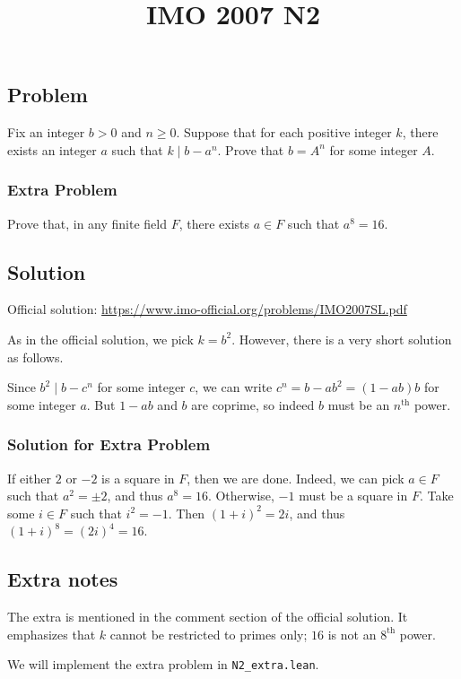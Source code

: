\documentclass{article}
\title{IMO 2007 N2}
\author{}
\date{}
\begin{document}
\maketitle



\subsection*{Problem}

Fix an integer $b > 0$ and $n \geq 0$.
Suppose that for each positive integer $k$, there exists an integer $a$ such that $k \mid b - a^n$.
Prove that $b = A^n$ for some integer $A$.


\subsubsection*{Extra Problem}

Prove that, in any finite field $F$, there exists $a \in F$ such that $a^8 = 16$.



\subsection*{Solution}

Official solution: \url{https://www.imo-official.org/problems/IMO2007SL.pdf}

As in the official solution, we pick $k = b^2$.
However, there is a very short solution as follows.

Since $b^2 \mid b - c^n$ for some integer $c$, we can write $c^n = b - ab^2 = (1 - ab) b$ for some integer $a$.
But $1 - ab$ and $b$ are coprime, so indeed $b$ must be an $n^{\text{th}}$ power.


\subsubsection*{Solution for Extra Problem}

If either $2$ or $-2$ is a square in $F$, then we are done.
Indeed, we can pick $a \in F$ such that $a^2 = \pm 2$, and thus $a^8 = 16$.
Otherwise, $-1$ must be a square in $F$.
Take some $i \in F$ such that $i^2 = -1$.
Then $(1 + i)^2 = 2i$, and thus $(1 + i)^8 = (2i)^4 = 16$.



\subsection*{Extra notes}

The extra is mentioned in the comment section of the official solution.
It emphasizes that $k$ cannot be restricted to primes only; $16$ is not an $8^{\text{th}}$ power.

We will implement the extra problem in \texttt{N2\_extra.lean}.
\end{document}
